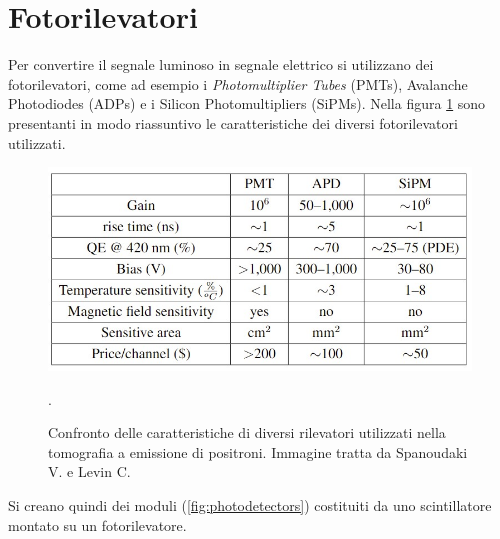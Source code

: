 \section{Fotorilevatori}
Per convertire il segnale luminoso in segnale elettrico si utilizzano dei fotorilevatori, come ad esempio i \textit{Photomultiplier Tubes} (PMTs), Avalanche Photodiodes (ADPs) e i Silicon Photomultipliers (SiPMs). Nella figura \ref{fig:photodetectors_performance} sono presentanti in modo riassuntivo le caratteristiche dei diversi fotorilevatori utilizzati.
\begin{figure}[tbh]
	\centering
	\includegraphics[width=0.7\linewidth]{./ImageFiles/table_pet_detectors_properties.jpg}
	\caption{Confronto delle caratteristiche di diversi rilevatori utilizzati nella tomografia a emissione di positroni. Immagine tratta da Spanoudaki V. e Levin C.\cite{Spanoudaki2010}}. 
	\label{fig:photodetectors_performance}
\end{figure}
Si creano quindi dei moduli (\Fig\ref{fig:photodetectors}) costituiti da uno scintillatore montato su un fotorilevatore.
